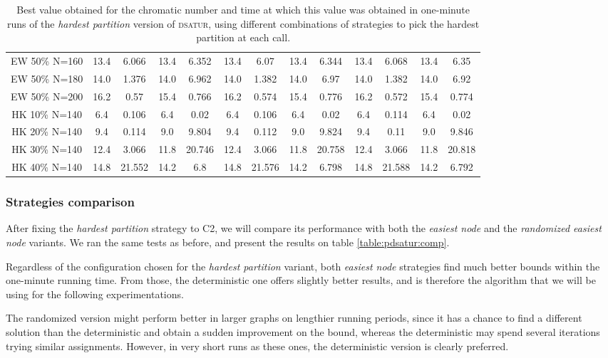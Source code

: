 \begin{sidewaystable}
\begin{tabular}{|c|cc|cc|cc|cc|cc|cc|}
\\
EW 50\% N=160 & 13.4 & 6.066 & 13.4 & 6.352 & 13.4 & 6.07 & 13.4 & 6.344 & 13.4 & 6.068 & 13.4 & 6.35
\\
EW 50\% N=180 & 14.0 & 1.376 & 14.0 & 6.962 & 14.0 & 1.382 & 14.0 & 6.97 & 14.0 & 1.382 & 14.0 & 6.92
\\
EW 50\% N=200 & 16.2 & 0.57 & 15.4 & 0.766 & 16.2 & 0.574 & 15.4 & 0.776 & 16.2 & 0.572 & 15.4 & 0.774
\\
\hline
HK 10\% N=140 &  6.4 & 0.106 &  6.4 & 0.02 &  6.4 & 0.106 &  6.4 & 0.02 &  6.4 & 0.114 &  6.4 & 0.02
\\
HK 20\% N=140 &  9.4 & 0.114 &  9.0 & 9.804 &  9.4 & 0.112 &  9.0 & 9.824 &  9.4 & 0.11 &  9.0 & 9.846
\\
HK 30\% N=140 & 12.4 & 3.066 & 11.8 & 20.746 & 12.4 & 3.066 & 11.8 & 20.758 & 12.4 & 3.066 & 11.8 & 20.818
\\
HK 40\% N=140 & 14.8 & 21.552 & 14.2 &  6.8 & 14.8 & 21.576 & 14.2 & 6.798 & 14.8 & 21.588 & 14.2 & 6.792
\\
\hline 
 \end{tabular}
\caption{Best value obtained for the chromatic number and time at which this value was obtained in one-minute runs of the \textit{hardest partition} version of \textsc{dsatur}, using different combinations of strategies to pick the hardest partition at each call.}

\end{sidewaystable}

\subsubsection*{Strategies comparison}

After fixing the \textit{hardest partition} strategy to C2, we will compare its performance with both the \textit{easiest node} and the \textit{randomized easiest node} variants. We ran the same tests as before, and present the results on table \ref{table:pdsatur:comp}.

Regardless of the configuration chosen for the \textit{hardest partition} variant, both \textit{easiest node} strategies find much better bounds within the one-minute running time. From those, the deterministic one offers slightly better results, and is therefore the algorithm that we will be using for the following experimentations. 

The randomized version might perform better in larger graphs on lengthier running periods, since it has a chance to find a different solution than the deterministic and obtain a sudden improvement on the bound, whereas the deterministic may spend several iterations trying similar assignments. However, in very short runs as these ones, the deterministic version is clearly preferred.  

